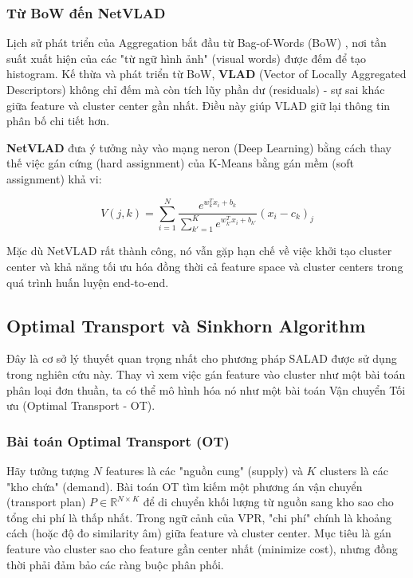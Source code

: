 \documentclass[12pt,a4paper]{article}
\begin{document}
    \subsubsection{Từ BoW đến NetVLAD}

    Lịch sử phát triển của Aggregation bắt đầu từ Bag-of-Words (BoW) \cite{sivic2003video}, nơi tần suất xuất hiện của các "từ ngữ hình ảnh" (visual words) được đếm để tạo histogram. Kế thừa và phát triển từ BoW, \textbf{VLAD} (Vector of Locally Aggregated Descriptors) không chỉ đếm mà còn tích lũy phần dư (residuals) - sự sai khác giữa feature và cluster center gần nhất. Điều này giúp VLAD giữ lại thông tin phân bố chi tiết hơn.

    \textbf{NetVLAD} \cite{arandjelovic2016netvlad} đưa ý tưởng này vào mạng neron (Deep Learning) bằng cách thay thế việc gán cứng (hard assignment) của K-Means bằng gán mềm (soft assignment) khả vi:

    \begin{equation}
        V(j,k) = \sum_{i=1}^{N} \frac{e^{w_k^T x_i + b_k}}{\sum_{k'=1}^{K} e^{w_{k'}^T x_i + b_{k'}}} (x_i - c_k)_j
    \end{equation}

    Mặc dù NetVLAD rất thành công, nó vẫn gặp hạn chế về việc khởi tạo cluster center và khả năng tối ưu hóa đồng thời cả feature space và cluster centers trong quá trình huấn luyện end-to-end.

    \subsection{Optimal Transport và Sinkhorn Algorithm}

    Đây là cơ sở lý thuyết quan trọng nhất cho phương pháp SALAD được sử dụng trong nghiên cứu này. Thay vì xem việc gán feature vào cluster như một bài toán phân loại đơn thuần, ta có thể mô hình hóa nó như một bài toán Vận chuyển Tối ưu (Optimal Transport - OT).

    \subsubsection{Bài toán Optimal Transport (OT)}

    Hãy tưởng tượng $N$ features là các "nguồn cung" (supply) và $K$ clusters là các "kho chứa" (demand). Bài toán OT tìm kiếm một phương án vận chuyển (transport plan) $P \in \mathbb{R}^{N \times K}$ để di chuyển khối lượng từ nguồn sang kho sao cho tổng chi phí là thấp nhất. Trong ngữ cảnh của VPR, "chi phí" chính là khoảng cách (hoặc độ đo similarity âm) giữa feature và cluster center. Mục tiêu là gán feature vào cluster sao cho feature gần center nhất (minimize cost), nhưng đồng thời phải đảm bảo các ràng buộc phân phối.
\end{document}

